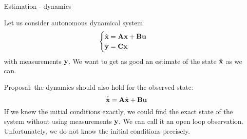 \documentclass{beamer}
\begin{document}
\begin{frame}{Estimation - dynamics}
\begin{flushleft}

Let us consider autonomous dynamical system
\begin{equation}
\label{eq:LTI}
\begin{cases}
\dot {\mathbf{x}} = \mathbf{A} \mathbf{x} + \mathbf{B} \mathbf{u} \\
\mathbf{y} = \mathbf{C} \mathbf{x}
\end{cases}
\end{equation}
%
with measurements $\mathbf{y}$. We want to get as good an estimate of the state $\hat{\mathbf{x}}$ as we can.

\bigskip

Proposal: the dynamics should also hold for the observed state:
\begin{equation}
\hat{\dot {\mathbf{x}}} = \mathbf{A} \hat{\mathbf{x}} + \mathbf{B} \mathbf{u}
\end{equation}
%
If we knew the initial conditions exactly, we could find the exact state of the system without using measurements $\mathbf{y}$. We can call it an open loop observation. Unfortunately, we do not know the initial conditions precisely.


\end{flushleft}
\end{frame}
\end{document}
